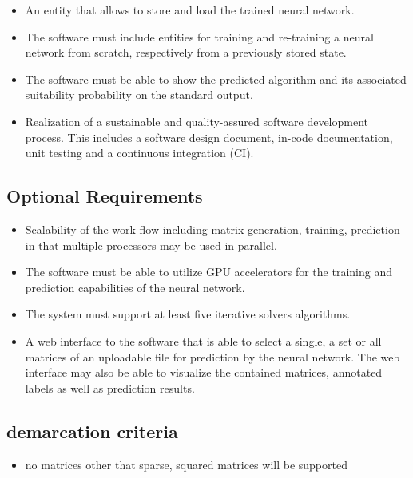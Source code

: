 \documentclass[parskip=full]{scrartcl}
\begin{document}
\begin{itemize}
\item An entity that allows to store and load the trained neural network.

\item The software must include entities for training and re-training a neural network from scratch, respectively from a previously stored state.

\item The software must be able to show the predicted algorithm and its associated suitability probability on the standard output.

\item Realization of a sustainable and quality-assured software development process. This includes a software design document, in-code documentation, unit testing and a continuous integration (CI).

\end{itemize}

\subsection{Optional Requirements}

\begin{itemize}
    
\item Scalability of the work-flow including matrix generation, training, prediction in that multiple processors may be used in parallel.

\item The software must be able to utilize GPU accelerators for the training and prediction capabilities of the neural network.

\item The system must support at least five \glspl{iterative solver} algorithms.

\item A web interface to the software that is able to select a single, a set or all matrices of an uploadable file for prediction by the neural network. The web interface may also be able to visualize the contained matrices, annotated labels as well as prediction results.

\end{itemize}

\subsection{demarcation criteria}
\begin{itemize}
\item no matrices other that sparse, squared matrices will be supported
\end{itemize}
\end{document}
